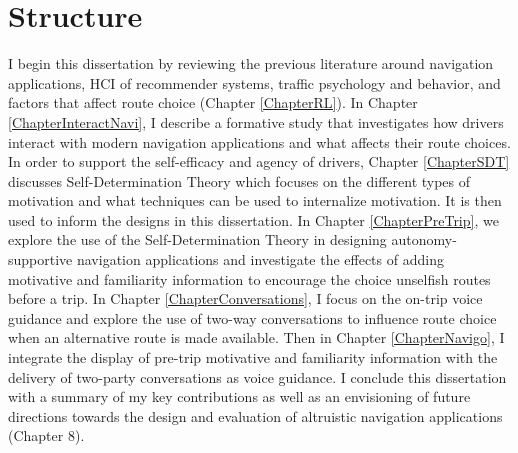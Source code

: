 \section{Structure}
I begin this dissertation by reviewing the previous literature around navigation applications, HCI of recommender systems, traffic psychology and behavior, and factors that affect route choice (Chapter \ref{ChapterRL}). In Chapter \ref{ChapterInteractNavi}, I describe a formative study that investigates how drivers interact with modern navigation applications and what affects their route choices. In order to support the self-efficacy and agency of drivers, Chapter \ref{ChapterSDT} discusses Self-Determination Theory which focuses on the different types of motivation and what techniques can be used to internalize motivation. It is then used to inform the designs in this dissertation. In Chapter \ref{ChapterPreTrip}, we explore the use of the Self-Determination Theory in designing autonomy-supportive navigation applications and investigate the effects of adding motivative and familiarity information to encourage the choice unselfish routes before a trip. In Chapter \ref{ChapterConversations}, I focus on the on-trip voice guidance and explore the use of two-way conversations to influence route choice when an alternative route is made available. Then in Chapter \ref{ChapterNavigo}, I integrate the display of pre-trip motivative and familiarity information with the delivery of two-party conversations as voice guidance. I conclude this dissertation with a summary of my key contributions as well as an envisioning of future directions towards the design and evaluation of altruistic navigation applications (Chapter 8).
